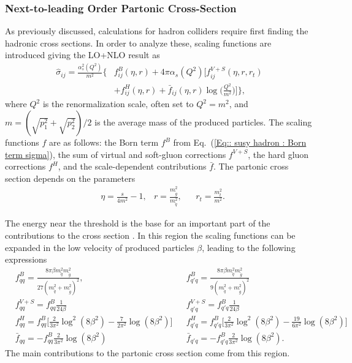\documentclass[twoside,english]{uiofysmaster}
\begin{document}
{\subsubsection{Next-to-leading Order Partonic Cross-Section}

As previously discussed, calculations for hadron colliders require first finding the hadronic cross sections. In order to analyze these, scaling functions are introduced \cite{beenakker1997squark} giving the LO+NLO result as
\begin{align}\label{Eq:: susy hadron : Partonic cross section LO+NLO}
\hat{\sigma}_{ij} = \frac{\alpha_s^2(Q^2)}{m^2} \Big\{ &f^B_{ij}(\eta, r) + 4 \pi \alpha_s (Q^2) \Bigg[ f_{ij}^{V+S}(\eta, r, r_t) \nonumber \\ & + f_{ij}^H (\eta, r) + \bar{f}_{ij} (\eta, r) \log \Bigg( \frac{Q^2}{m^2}\Bigg) \Bigg] \Big\},
\end{align}
where $Q^2$ is the renormalization scale, often set to $Q^2 = m^2$, and $m = (\sqrt{p_1^2} + \sqrt{p_2^2})/2$ is the average mass of the produced particles. The scaling functions $f$ are as follows: the Born term $f^B$ from Eq.~(\ref{Eq:: susy hadron : Born term sigma}), the sum of virtual and soft-gluon corrections $f^{V+S}$, the hard gluon corrections $f^H$, and the scale-dependent contributions $\bar{f}$. The partonic cross section depends on the parameters
\begin{align}
&\eta = \frac{s}{4m^2} -1, &r= \frac{m_{\widetilde{g}}^2}{m_{\widetilde{q}}^2}, &&r_t = \frac{m_t^2}{m^2}.
\end{align}

The energy near the threshold is the base for an important part of the contributions to the cross section \cite{beenakker1997squark}. In this region the scaling functions can be expanded in the low velocity of produced particles $\beta$, leading to the following expressions \cite{beenakker1997squark}
\begin{align}
&f_{qq}^B = \frac{8 \pi \beta m_{\widetilde{q}}^2 m_{\widetilde{g}}^2}{27(m_{\widetilde{q}}^2 + m_{\widetilde{g}}^2)^2}, &&f_{q'q}^B = \frac{8 \pi \beta m_{\widetilde{q}}^2 m_{\widetilde{g}}^2}{9(m_{\widetilde{q}}^2 + m_{\widetilde{g}}^2)^2} \nonumber \\
& f_{qq}^{V+S} = f_{qq}^B \frac{1}{24 \beta} && f_{q'q}^{V+S} = f_{q'q}^B \frac{1}{24 \beta} \nonumber \\
&f_{qq}^H = f_{qq}^B \Big[\frac{2}{3 \pi^2} \log^2(8 \beta^2) - \frac{7}{2 \pi^2} \log (8 \beta^2) \Big] &&f_{q'q}^H = f_{q'q}^B \Big[\frac{2}{3 \pi^2} \log^2(8 \beta^2) - \frac{19}{6 \pi^2} \log (8 \beta^2) \Big] \nonumber \\
& \bar{f}_{qq} = - f_{qq}^B \frac{2}{3 \pi^2} \log (8 \beta^2) &&\bar{f}_{q'q} = - f_{q'q}^B \frac{2}{3 \pi^2} \log (8 \beta^2).\label{Eq:: susy hadron : Scaling functions near threshold}
\end{align}
The main contributions to the partonic cross section come from this region.

}
\end{document}

